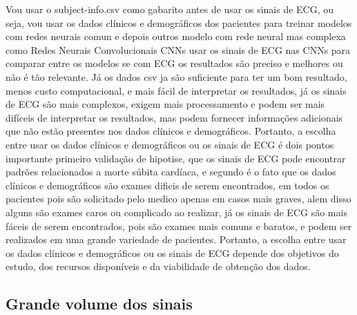 Vou usar o subject-info.csv como gabarito antes de usar os sinais de ECG, ou seja, vou usar os dados clínicos e demográficos dos pacientes para treinar modelos com redes neurais comun e depois outros modelo com rede neural  mas complexa como Redes Neurais Convolucionais \gls{CNNs} usar os sinais de ECG nas \gls{CNNs} para comparar entre os modelos se com ECG os resultados são preciso e melhores ou não é tão relevante. Já os dados csv ja são suficiente para ter um bom resultado, menos custo computacional, e mais fácil de interpretar os resultados, já os sinais de ECG são mais complexos, exigem mais processamento e podem ser mais difíceis de interpretar os resultados, mas podem fornecer informações adicionais que não estão presentes nos dados clínicos e demográficos. Portanto, a escolha entre usar os dados clínicos e demográficos ou os sinais de ECG é dois pontos importante primeiro validação de hipotise, que os sinais de ECG pode encontrar padrões relacionados a morte súbita cardíaca, e segundo é o fato que os dados clínicos e demográficos são exames dificis de serem encontrados, em todos os pacientes pois são solicitado pelo medico apenas em casos mais graves, alem disso alguns são  exames caros ou complicado ao realizar, já os sinais de ECG são mais fáceis de serem encontrados, pois são exames mais comuns e baratos, e podem ser realizados em uma grande variedade de pacientes. Portanto, a escolha entre usar os dados clínicos e demográficos ou os sinais de ECG depende dos objetivos do estudo, dos recursos disponíveis e da viabilidade de obtenção dos dados.



\subsection{Grande volume dos sinais} \label{sec:grande_volume}

